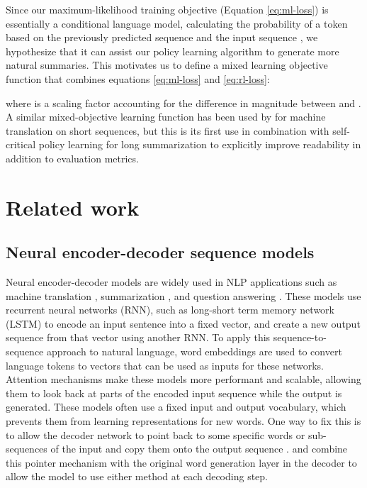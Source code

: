 \documentclass{article} \usepackage{iclr2018_arxiv,times}
\begin{document}
Since our maximum-likelihood training objective (Equation \ref{eq:ml-loss}) is essentially a conditional language model, calculating the probability of a token  based on the previously predicted sequence  and the input sequence , we hypothesize that it can assist our policy learning algorithm to generate more natural summaries. This motivates us to define a mixed learning objective function that combines equations \ref{eq:ml-loss} and \ref{eq:rl-loss}:

where  is a scaling factor accounting for the difference in magnitude between  and . A similar mixed-objective learning function has been used by \citet{wu2016} for machine translation on short sequences, but this is its first use in combination with self-critical policy learning for long summarization to explicitly improve readability in addition to evaluation metrics.

\section{Related work}
\label{sec:related-work}

\subsection{Neural encoder-decoder sequence models}
\label{ssec:neural-sequence-models}


Neural encoder-decoder models are widely used in NLP applications such as machine translation \citep{sutskever2014}, summarization \citep{chopra2016,nallapati2016}, and question answering \citep{hermann2015}. These models use recurrent neural networks (RNN), such as long-short term memory network (LSTM) \citep{hochreiter1997} to encode an input sentence into a fixed vector, and create a new output sequence from that vector using another RNN. To apply this sequence-to-sequence approach to natural language, word embeddings \citep{mikolov2013,pennington2014} are used to convert language tokens to vectors that can be used as inputs for these networks.
Attention mechanisms \citep{bahdanau2014} make these models more performant and scalable, allowing them to look back at parts of the encoded input sequence while the output is generated.
These models often use a fixed input and output vocabulary, which prevents them from learning representations for new words. One way to fix this is to allow the decoder network to point back to some specific words or sub-sequences of the input and copy them onto the output sequence \citep{vinyals2015}. \citet{gulcehre2016} and \citet{merity2016} combine this pointer mechanism with the original word generation layer in the decoder to allow the model to use either method at each decoding step.
\end{document}
